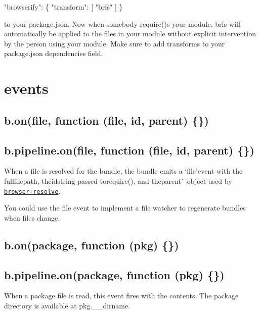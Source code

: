 \begin{DoxyCode}
"browserify": \{ "transform": [ "brfs" ] \}
\end{DoxyCode}


to your package.\+json. Now when somebody {\ttfamily require()}s your module, brfs will automatically be applied to the files in your module without explicit intervention by the person using your module. Make sure to add transforms to your package.\+json dependencies field.

\section*{events}

\subsection*{b.\+on(\textquotesingle{}file\textquotesingle{}, function (file, id, parent) \{\})}

\subsection*{b.\+pipeline.\+on(\textquotesingle{}file\textquotesingle{}, function (file, id, parent) \{\})}

When a file is resolved for the bundle, the bundle emits a `\textquotesingle{}file'{\ttfamily event with the full}file{\ttfamily path, the}id{\ttfamily string passed to}require(){\ttfamily , and the}parent\`{} object used by \href{https://github.com/defunctzombie/node-browser-resolve}{\tt browser-\/resolve}.

You could use the {\ttfamily file} event to implement a file watcher to regenerate bundles when files change.

\subsection*{b.\+on(\textquotesingle{}package\textquotesingle{}, function (pkg) \{\})}

\subsection*{b.\+pipeline.\+on(\textquotesingle{}package\textquotesingle{}, function (pkg) \{\})}

When a package file is read, this event fires with the contents. The package directory is available at {\ttfamily pkg.\+\_\+\+\_\+dirname}.

